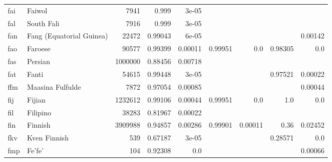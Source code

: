 \documentclass[11pt]{article}
\begin{document}
\begin{table*}[h]
{\begin{tabular}{llrrrrrrr}
fai         & Faiwol         & 7941         & 0.999         & 3e-05         &          &          &          &          \\

fal         & South Fali         & 7916         & 0.999         & 3e-05         &          &          &          &          \\

fan         & Fang (Equatorial Guinea)         & 22472         & 0.99043         & 6e-05         &          &          &          & 0.00142         \\

fao         & Faroese         & 90577         & 0.99399         & 0.00011         & 0.99951         & 0.0         & 0.98305         & 0.0         \\

fas         & Persian         & 1000000         & 0.88456         & 0.00718         &          &          &          &          \\

fat         & Fanti         & 54615         & 0.99448         & 3e-05         &          &          & 0.97521         & 0.00022         \\

ffm         & Maasina Fulfulde         & 7872         & 0.97054         & 0.00085         &          &          &          & 0.00044         \\

fij         & Fijian         & 1232612         & 0.99106         & 0.00044         & 0.99951         & 0.0         & 1.0         & 0.0         \\

fil         & Filipino         & 38283         & 0.81967         & 0.00022         &          &          &          &          \\

fin         & Finnish         & 3909988         & 0.94857         & 0.00286         & 0.99901         & 0.00011         & 0.36         & 0.02452         \\

fkv         & Kven Finnish         & 539         & 0.67187         & 3e-05         &          &          & 0.28571         & 0.0         \\

fmp         & Fe'fe'         & 104         & 0.92308         & 0.0         &          &          &          & 0.00066         \\


\end{tabular}}
\end{table*}
\end{document}
